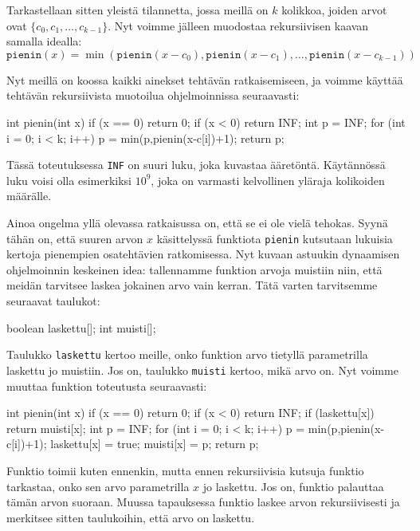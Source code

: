 Tarkastellaan sitten yleistä tilannetta, jossa meillä on $k$ kolikkoa,
joiden arvot ovat $\{c_0,c_1,\ldots,c_{k-1}\}$.
Nyt voimme jälleen muodostaa rekursiivisen kaavan samalla idealla:
\[
\texttt{pienin}(x) =
    \min(\texttt{pienin}(x-c_0),\texttt{pienin}(x-c_1),\dots,\texttt{pienin}(x-c_{k-1}))
\]

Nyt meillä on koossa kaikki ainekset tehtävän ratkaisemiseen,
ja voimme käyttää tehtävän rekursiivista muotoilua ohjelmoinnissa
seuraavasti:

\begin{code}
int pienin(int x) {
    if (x == 0) return 0;
    if (x < 0) return INF;
    int p = INF;
    for (int i = 0; i < k; i++) {
        p = min(p,pienin(x-c[i])+1);
    }
    return p;
}
\end{code}

Tässä toteutuksessa \texttt{INF} on suuri luku, joka kuvastaa ääretöntä.
Käytän\-nössä luku voisi olla esimerkiksi $10^9$,
joka on varmasti kelvollinen yläraja kolikoiden määrälle.

Ainoa ongelma yllä olevassa ratkaisussa on,
että se ei ole vielä tehokas.
Syynä tähän on, että suuren arvon $x$ käsittelyssä
funktiota \texttt{pienin} kutsutaan lukuisia kertoja
pienempien osatehtävien ratkomisessa.
Nyt kuvaan astuukin dynaamisen ohjelmoinnin keskeinen idea:
tallennamme funktion arvoja muistiin niin, että meidän
tarvitsee laskea jokainen arvo vain kerran.
Tätä varten tarvitsemme seuraavat taulukot:

\begin{code}
boolean laskettu[];
int muisti[];
\end{code}

Taulukko \texttt{laskettu} kertoo meille, onko funktion arvo
tietyllä parametrilla laskettu jo muistiin.
Jos on, taulukko \texttt{muisti} kertoo, mikä arvo on.
Nyt voimme muuttaa funktion toteutusta seuraavasti:

\begin{code}
int pienin(int x) {
    if (x == 0) return 0;
    if (x < 0) return INF;
    if (laskettu[x]) return muisti[x];
    int p = INF;
    for (int i = 0; i < k; i++) {
        p = min(p,pienin(x-c[i])+1);
    }
    laskettu[x] = true;
    muisti[x] = p;
    return p;
}
\end{code}

Funktio toimii kuten ennenkin, mutta ennen rekursiivisia kutsuja
funktio tarkastaa, onko sen arvo parametrilla $x$ jo laskettu.
Jos on, funktio palauttaa tämän arvon suoraan.
Muussa tapauksessa funktio laskee arvon rekursiivisesti
ja merkitsee sitten taulukoihin, että arvo on laskettu.

